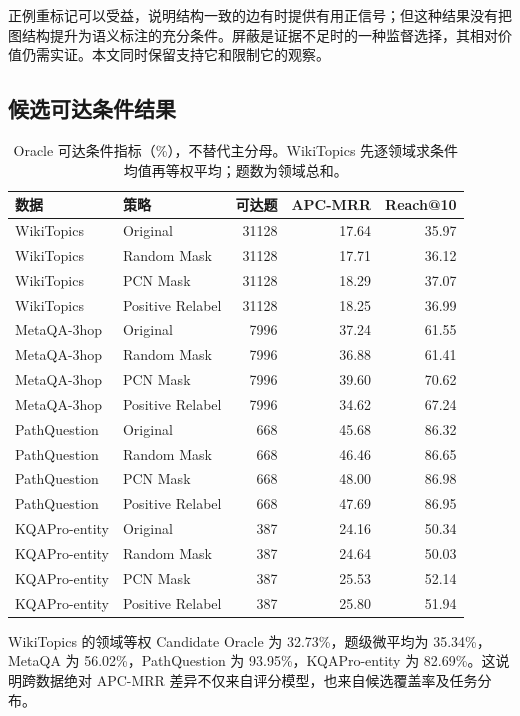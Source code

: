 \documentclass[UTF8,a4paper,10pt,fontset=fandol]{ctexart}
\begin{document}
正例重标记可以受益，说明结构一致的边有时提供有用正信号；但这种结果没有把图结构提升为语义标注的充分条件。屏蔽是证据不足时的一种监督选择，其相对价值仍需实证。本文同时保留支持它和限制它的观察。

\subsection{候选可达条件结果}
\begin{table}[tbp]\centering
\caption{Oracle 可达条件指标（\%），不替代主分母。WikiTopics 先逐领域求条件均值再等权平均；题数为领域总和。}\label{tab:conditional}
\small
\begin{tabular}{llrrr}
\toprule
数据 & 策略 & 可达题 & APC-MRR & Reach@10 \\
\midrule
WikiTopics & Original & 31128 & 17.64 & 35.97 \\
WikiTopics & Random Mask & 31128 & 17.71 & 36.12 \\
WikiTopics & PCN Mask & 31128 & 18.29 & 37.07 \\
WikiTopics & Positive Relabel & 31128 & 18.25 & 36.99 \\
MetaQA-3hop & Original & 7996 & 37.24 & 61.55 \\
MetaQA-3hop & Random Mask & 7996 & 36.88 & 61.41 \\
MetaQA-3hop & PCN Mask & 7996 & 39.60 & 70.62 \\
MetaQA-3hop & Positive Relabel & 7996 & 34.62 & 67.24 \\
PathQuestion & Original & 668 & 45.68 & 86.32 \\
PathQuestion & Random Mask & 668 & 46.46 & 86.65 \\
PathQuestion & PCN Mask & 668 & 48.00 & 86.98 \\
PathQuestion & Positive Relabel & 668 & 47.69 & 86.95 \\
KQAPro-entity & Original & 387 & 24.16 & 50.34 \\
KQAPro-entity & Random Mask & 387 & 24.64 & 50.03 \\
KQAPro-entity & PCN Mask & 387 & 25.53 & 52.14 \\
KQAPro-entity & Positive Relabel & 387 & 25.80 & 51.94 \\
\bottomrule
\end{tabular}
\end{table}

WikiTopics 的领域等权 Candidate Oracle 为 32.73\%，题级微平均为 35.34\%，MetaQA 为 56.02\%，PathQuestion 为 93.95\%，KQAPro-entity 为 82.69\%。这说明跨数据绝对 APC-MRR 差异不仅来自评分模型，也来自候选覆盖率及任务分布。
\end{document}
